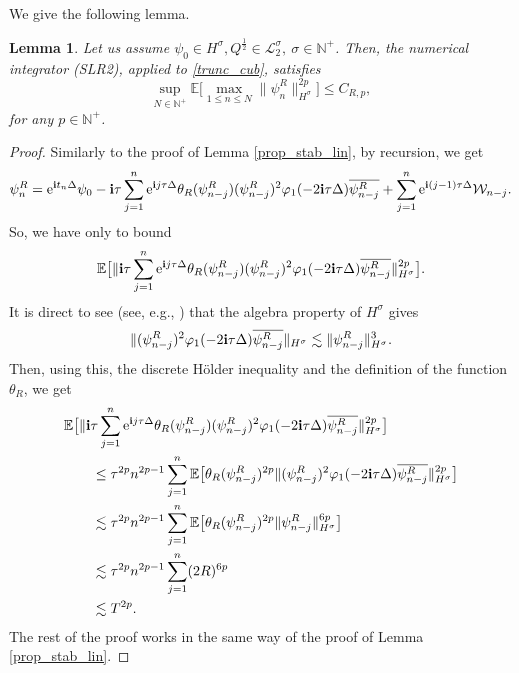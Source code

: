 \documentclass[a4paper]{amsart}
\newtheorem{lemma}[theorem]{Lemma}
\begin{document}
      We give the following lemma.
      \begin{lemma}
         Let us assume $\psi_0\in H^\sigma, Q^{\frac{1}{2}}\in\mathcal{L}_2^\sigma, \ \sigma\in\mathbb{N}^+$. Then, the numerical integrator (SLR2), applied to \eqref{trunc_cub}, satisfies
         $$
         \sup_{N\in\mathbb{N}^+}\mathbb{E}\big[\max_{1\le n\le N}\|\psi^R_n\|_{H^\sigma}^{2p}\big]\le C_{R,p},
         $$
         for any $p\in\mathbb{N}^+$.
      \end{lemma}
      \begin{proof}
          Similarly to the proof of Lemma \ref{prop_stab_lin}, by recursion, we get
          $$
          \psi_n^R={\rm e}^{{\bf i}t_n\Delta} \psi_0-{\bf i}\tau \sum_{j=1}^{n}{\rm e}^{{\bf i}j\tau \Delta}\theta_R(\psi_{n-j}^R) (\psi_{n-j}^R)^2 \varphi_1(-2{\bf i}\tau\Delta)\overline{\psi_{n-j}^R}+\sum_{j=1}^{n}{\rm e}^{{\bf i}(j-1)\tau\Delta}\mathcal{W}_{n-j}.
          $$
          So, we have only to bound 
          $$
          \mathbb{E}\big[\|{\bf i}\tau\sum_{j=1}^{n}{\rm e}^{{\bf i}j\tau \Delta}\theta_R(\psi_{n-j}^R) (\psi_{n-j}^R)^2 \varphi_1(-2{\bf i}\tau\Delta)\overline{\psi_{n-j}^R}\|^{2p}_{H^\sigma}\big].
          $$
          It is direct to see (see, e.g., \cite{os_ka}) that the algebra property of $H^\sigma$ gives
          $$
          \| (\psi_{n-j}^R)^2 \varphi_1(-2{\bf i}\tau\Delta)\overline{\psi_{n-j}^R}\|_{H^\sigma}\lesssim \|\psi_{n-j}^R\|^3_{H^\sigma}.
          $$
          Then, using this, the discrete Hölder inequality and the definition of the function $\theta_R$, we get
          \begin{align*}
             & \mathbb{E}\big[\|{\bf i}\tau\sum_{j=1}^{n}{\rm e}^{{\bf i}j\tau \Delta}\theta_R(\psi_{n-j}^R) (\psi_{n-j}^R)^2 \varphi_1(-2{\bf i}\tau\Delta)\overline{\psi_{n-j}^R}\|^{2p}_{H^\sigma}\big]\\
             &\qquad \le \tau^{2p} n^{2p-1} \sum_{j=1}^{n}\mathbb{E}\big[\theta_R(\psi_{n-j}^R)^{2p}\|(\psi_{n-j}^R)^2 \varphi_1(-2{\bf i}\tau\Delta)\overline{\psi_{n-j}^R}\|^{2p}_{H^\sigma}\big]\\
             &\qquad \lesssim \tau^{2p} n^{2p-1} \sum_{j=1}^{n}\mathbb{E}\big[\theta_R(\psi_{n-j}^R)^{2p}\|\psi_{n-j}^R\|^{6p}_{H^\sigma}\big]\\
             &\qquad \lesssim \tau^{2p} n^{2p-1} \sum_{j=1}^{n} (2R)^{6p}\\
             &\qquad \lesssim T^{2p}.
          \end{align*}
          The rest of the proof works in the same way of the proof of Lemma \ref{prop_stab_lin}.
      \end{proof}
\end{document}
